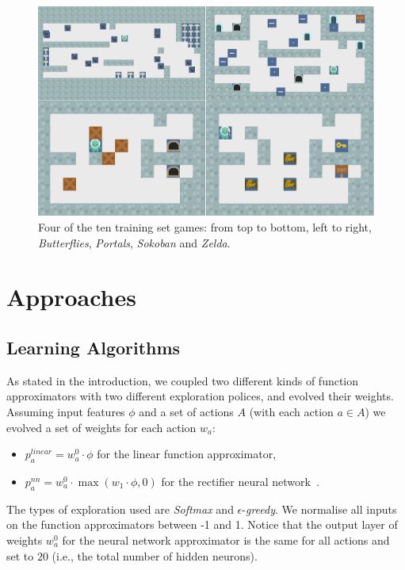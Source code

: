\documentclass[conference]{IEEEtran}
\begin{document}
\begin{figure}[!t]
\begin{center}
\includegraphics[width=1.8\columnwidth]{img/games}
\end{center}
\caption{Four of the ten training set games: from top to bottom, left to right, \textit{Butterflies}, \textit{Portals}, \textit{Sokoban} and \textit{Zelda}.}
\label{fig:games}
\end{figure}



\section{Approaches} \label{sec:approaches}

\subsection{Learning Algorithms}
As stated in the introduction, we coupled two different kinds of function approximators with two different exploration polices, and evolved their weights. Assuming input features $\phi$ and a set of actions $A$ (with each action $a \in A$) we evolved a set of weights for each action $w_a$:
\begin{itemize}
\item $p^{linear}_a = w_a^0 \cdot \phi$ for the linear function approximator, 
\item $p^{nn}_a = w_a^0 \cdot \max { (w_1 \cdot \phi, 0) } $ for the rectifier neural network~\cite{glorot2011deep}.
\end{itemize}
The types of exploration used are \textit{Softmax} and $\epsilon$-\textit{greedy}. We normalise all inputs on the function approximators between -1 and 1. Notice that the output layer of weights $w_a^0$ for the neural network approximator is the same for all actions and set to $20$ (i.e., the total number of hidden neurons). 
\end{document}
